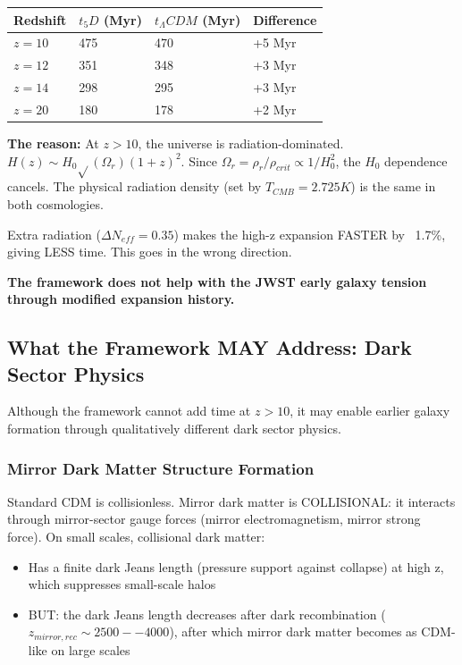 \documentclass[aps,prd,preprint,superscriptaddress,longbibliography]{revtex4-2}
\begin{document}
\begin{table}[H]
\begin{ruledtabular}
\begin{tabular}{p{3.8cm}p{3.8cm}p{3.8cm}p{3.8cm}}
Redshift & $t_5D$ (Myr) & $t_\Lambda CDM$ (Myr) & Difference \\
\hline
$z = 10$ & 475 & 470 & +5 Myr \\
$z = 12$ & 351 & 348 & +3 Myr \\
$z = 14$ & 298 & 295 & +3 Myr \\
$z = 20$ & 180 & 178 & +2 Myr \\
\end{tabular}
\end{ruledtabular}
\end{table}

\textbf{The reason:} At $z > 10$, the universe is radiation-dominated. $H(z) \sim  H_{0} \sqrt{}(\Omega_r) (1+z)^{2}$. Since $\Omega_r = \rho_r/\rho_{crit} \propto 1/H_{0}^{2}$, the $H_{0}$ dependence cancels. The physical radiation density (set by $T_{CMB} = 2.725 K$) is the same in both cosmologies.

Extra radiation ($\Delta N_{eff} = 0.35$) makes the high-z expansion FASTER by ~1.7\%, giving LESS time. This goes in the wrong direction.

\textbf{The framework does not help with the JWST early galaxy tension through modified expansion history.}



\subsection{What the Framework MAY Address: Dark Sector Physics}

Although the framework cannot add time at $z > 10$, it may enable earlier galaxy formation through qualitatively different dark sector physics.


\subsubsection{Mirror Dark Matter Structure Formation}

Standard CDM is collisionless. Mirror dark matter is COLLISIONAL: it interacts through mirror-sector gauge forces (mirror electromagnetism, mirror strong force). On small scales, collisional dark matter:


\begin{itemize}
  \item Has a finite dark Jeans length (pressure support against collapse) at high z, which suppresses small-scale halos
  \item BUT: the dark Jeans length decreases after dark recombination ($z_{mirror,rec} \sim  2500--4000$), after which mirror dark matter becomes as CDM-like on large scales
\end{itemize}
\end{document}
